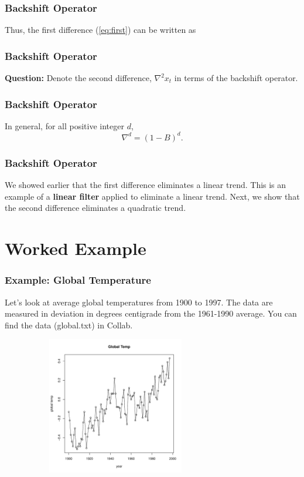 \documentclass[%
xcolor=pdftex]{beamer}
\begin{document}
\begin{frame}
\frametitle{Backshift Operator}

Thus, the first difference (\ref{eq:first}) can be written as

\vspace{50mm}

\end{frame}

\begin{frame}
\frametitle{Backshift Operator}

\textbf{Question:} Denote the second difference, $\nabla^2 x_t$ in terms of the backshift operator.

\vspace{50mm}

\end{frame}

\begin{frame}
\frametitle{Backshift Operator}

In general, for all positive integer $d$,
\begin{equation}
\nabla^d = (1-B)^d.
\end{equation}

\end{frame}

\begin{frame}
\frametitle{Backshift Operator}

We showed earlier that the first difference eliminates a linear trend. This is an example of a \textbf{linear filter} applied to eliminate a linear trend. Next, we show that the second difference eliminates a quadratic trend.

\vspace{50mm}

\end{frame}

\section{Worked Example}
\frame{\tableofcontents[currentsection]}

\begin{frame}
\frametitle{Example: Global Temperature}

Let's look at average global temperatures from 1900 to 1997. The data are measured in deviation in degrees centigrade from the 1961-1990 average. You can find the data (global.txt) in Collab.

\includegraphics[width=100mm, height=60mm]{pics/plots1.pdf}

\end{frame}
\end{document}
